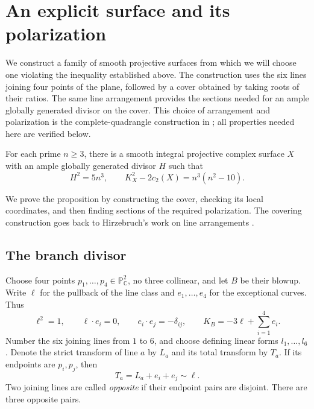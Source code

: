 \section{An explicit surface and its polarization}
\label{sec:surface}

We construct a family of smooth projective surfaces from which we will
choose one violating the inequality established above.  The construction uses the six lines joining
four points of the plane, followed by a cover obtained by taking roots of
their ratios.  The same line arrangement provides the sections needed for
an ample globally generated divisor on the cover.  This choice of
arrangement and polarization is the complete-quadrangle construction
in \cite[Section 7.2]{Anghel2026}; all properties needed here are verified below.

\begin{proposition}\label{prop:surface}
For each prime $n\geq3$, there is a smooth integral projective complex
surface $X$ with an ample globally generated divisor $H$ such that
\[
 H^2=5n^3,\qquad K_X^2-2c_2(X)=n^3(n^2-10).
\]
\end{proposition}

We prove the proposition by constructing the cover, checking its local
coordinates, and then finding sections of the required polarization.
The covering construction goes back to Hirzebruch's work on line
arrangements \cite{Hirzebruch1983}.

\subsection{The branch divisor}

Choose four points $p_1,\ldots,p_4\in\mathbb P^2_{\mathbb C}$, no three
collinear, and let $B$ be their blowup.  Write $\ell$ for the pullback of
the line class and $e_1,\ldots,e_4$ for the exceptional curves.  Thus
\[
 \ell^2=1,\qquad \ell\cdot e_i=0,\qquad
 e_i\cdot e_j=-\delta_{ij},\qquad
 K_B=-3\ell+\sum_{i=1}^4 e_i.
\]
Number the six joining lines from $1$ to $6$, and choose defining linear
forms $l_1,\ldots,l_6$.  Denote the strict transform of line $a$ by $L_a$
and its total transform by $T_a$.  If its endpoints are $p_i,p_j$, then
\[
 T_a=L_a+e_i+e_j\sim\ell.
\]
Two joining lines are called \emph{opposite} if their endpoint pairs are
disjoint.  There are three opposite pairs.

